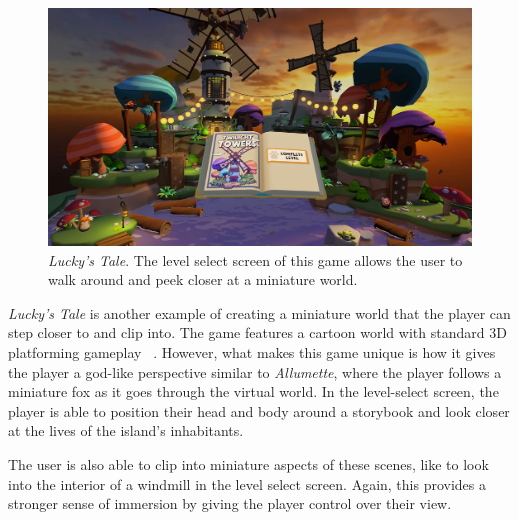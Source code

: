\documentclass[10pt,twocolumn,letterpaper]{article}
\begin{document}
\begin{figure}[t]
\begin{center}
\includegraphics[width=1.0\linewidth]{images/luckystale.jpg}
\end{center}
   \caption{\textit{Lucky's Tale}.  The level select screen of this game allows the user to walk around and peek closer at a miniature world. }
\label{fig:long}
\label{fig:onecol}
\end{figure}

\textit{Lucky's Tale} is another example of creating a miniature world that the player can step closer to and clip into. The game features a cartoon world with standard 3D platforming gameplay ~\cite{LuckysTale}. However, what makes this game unique is how it gives the player a god-like perspective similar to \textit{Allumette}, where the player follows a miniature fox as it goes through the virtual world. In the level-select screen, the player is able to position their head and body around a storybook and look closer at the lives of the island's inhabitants.

The user is also able to clip into miniature aspects of these scenes, like to look into the interior of a windmill in the level select screen. Again, this provides a stronger sense of immersion by giving the player control over their view.\\
\end{document}
